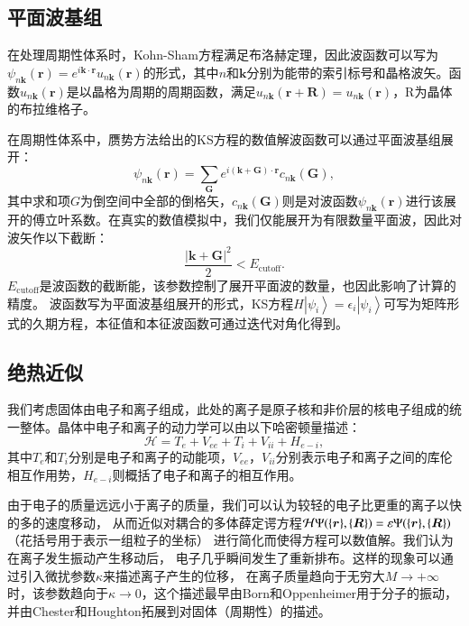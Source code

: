\subsection{平面波基组}
在处理周期性体系时，Kohn-Sham方程满足布洛赫定理，因此波函数可以写为$\psi_{n\bm{k}}(\bm{r})=e^{i\bm{k}\cdot \bm{r}} u_{n\bm{k}}(\bm{r})$的形式，其中$n$和$\bm{k}$分别为能带的索引标号和晶格波矢。函数$u_{n\bm{k}}(\bm{r})$是以晶格为周期的周期函数，满足$u_{n\bm{k}}(\bm{r}+\bm{R})=u_{n\bm{k}}(\bm{r})$，R为晶体的布拉维格子。

在周期性体系中，赝势方法给出的KS方程的数值解波函数可以通过平面波基组展开：
\begin{equation}
  \psi_{n\bm{k}}(\bm{r}) = \sum_{\bm{G}}e^{i(\bm{k}+\bm{G})\cdot \bm{r}}c_{n\bm{k}}(\bm{G}) ,
\end{equation}
其中求和项$G$为倒空间中全部的倒格矢，$c_{n\bm{k}}(\bm{G})$则是对波函数$\psi_{n\bm{k}}(\bm{r})$进行该展开的傅立叶系数。在真实的数值模拟中，我们仅能展开为有限数量平面波，因此对波矢作以下截断：
\begin{equation}
  \frac{|\bm{k} + \bm{G}|^2}{2} < E_{\mathrm{cutoff}} .
\end{equation}
$E_{\mathrm{cutoff}}$是波函数的截断能，该参数控制了展开平面波的数量，也因此影响了计算的精度。
波函数写为平面波基组展开的形式，KS方程$H\left|\psi_i\right>=\epsilon_i\left|\psi_i\right>$可写为矩阵形式的久期方程，本征值和本征波函数可通过迭代对角化得到。

\subsection{绝热近似}\label{sec:BO-approx}

我们考虑固体由电子和离子组成，此处的离子是原子核和非价层的核电子组成的统一整体。晶体中电子和离子的动力学可以由以下哈密顿量描述：
\begin{equation}
  \mathcal{H} = T_e + V_{ee} + T_i + V_{ii} + H_{e-i} ,
\end{equation}
其中$T_e$和$T_i$分别是电子和离子的动能项，$ V_{ee}$，$V_{ii}$分别表示电子和离子之间的库伦相互作用势，$H_{e-i}$则概括了电子和离子的相互作用。

由于电子的质量远远小于离子的质量，我们可以认为较轻的电子比更重的离子以快的多的速度移动，
从而近似对耦合的多体薛定谔方程$\mathcal{H} \Psi(\{\bm{r}\},\{\bm{R}\})=\mathcal{\varepsilon} \Psi(\{\bm{r}\},\{\bm{R}\})$ （花括号用于表示一组粒子的坐标）
进行简化而使得方程可以数值解。我们认为在离子发生振动产生移动后，
电子几乎瞬间发生了重新排布。这样的现象可以通过引入微扰参数$\kappa$来描述离子产生的位移，
在离子质量趋向于无穷大$M\rightarrow+\infty$时，该参数趋向于$\kappa\rightarrow 0$，这个描述最早由Born和Oppenheimer\cite{oppenheimer1927quantum}用于分子的振动，
并由Chester和Houghton\cite{chester1959electron}拓展到对固体（周期性）的描述。

